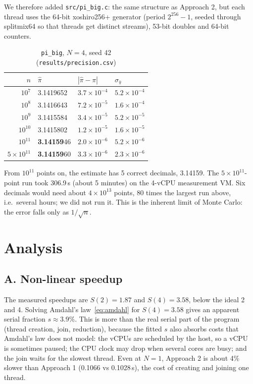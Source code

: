 \documentclass[11pt,a4paper]{article}
\newcommand{\code}[1]{\texttt{#1}}
\begin{document}
We therefore added \code{src/pi\_big.c}: the same structure as Approach 2, but each thread uses the 64-bit xoshiro256+ generator (period $2^{256}-1$, seeded through splitmix64 so that threads get distinct streams), 53-bit doubles and 64-bit counters.

\begin{table}[H]
\centering
\caption{\code{pi\_big}, $N=4$, seed 42 (\code{results/precision.csv})}
\label{tab:precision}
\begin{tabular}{rlll}
\toprule
$n$ & $\hat\pi$ & $|\hat\pi-\pi|$ & $\sigma_{\hat\pi}$ \\
\midrule
$10^{7}$  & 3.1419652 & $3.7\times10^{-4}$ & $5.2\times10^{-4}$ \\
$10^{8}$  & 3.1416643 & $7.2\times10^{-5}$ & $1.6\times10^{-4}$ \\
$10^{9}$  & 3.1415584 & $3.4\times10^{-5}$ & $5.2\times10^{-5}$ \\
$10^{10}$ & 3.1415802 & $1.2\times10^{-5}$ & $1.6\times10^{-5}$ \\
$10^{11}$ & \textbf{3.14159}46 & $2.0\times10^{-6}$ & $5.2\times10^{-6}$ \\
$5\times10^{11}$ & \textbf{3.14159}60 & $3.3\times10^{-6}$ & $2.3\times10^{-6}$ \\
\bottomrule
\end{tabular}
\end{table}
From $10^{11}$ points on, the estimate has 5 correct decimals, 3.14159. The $5\times10^{11}$-point run took 306.9\,s (about 5 minutes) on the 4-vCPU measurement VM. Six decimals would need about $4\times10^{13}$ points, 80 times the largest run above, i.e.\ several hours; we did not run it. This is the inherent limit of Monte Carlo: the error falls only as $1/\sqrt n$.

\section{Analysis}
\subsection{A. Non-linear speedup}
The measured speedups are $S(2)=1.87$ and $S(4)=3.58$, below the ideal 2 and 4. Solving Amdahl's law~\eqref{eq:amdahl} for $S(4)=3.58$ gives an apparent serial fraction $s\approx3.9\%$. This is more than the real serial part of the program (thread creation, join, reduction), because the fitted $s$ also absorbs costs that Amdahl's law does not model: the vCPUs are scheduled by the host, so a vCPU is sometimes paused; the CPU clock may drop when several cores are busy; and the join waits for the slowest thread. Even at $N=1$, Approach 2 is about 4\% slower than Approach 1 (0.1066 vs 0.1028\,s), the cost of creating and joining one thread.
\end{document}
